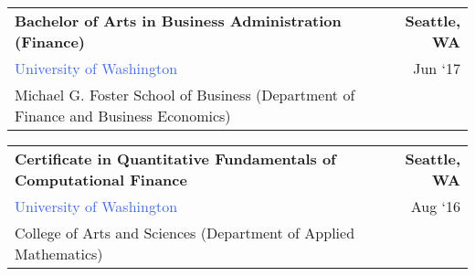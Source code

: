 \documentclass[10pt]{article}
\newcommand{\highlightcolor}{RoyalBlue}
\newcommand{\tabularxwidth}{\textwidth}
\begin{document}
            \vspace{.5em}
        

    
        \begin{tabularx}{\tabularxwidth}{X r}
            \textbf{Bachelor of Arts in Business Administration (Finance)} & \textbf{
    Seattle, 
        WA} \\
            \quad \textcolor{\highlightcolor}{University of Washington} & 
    Jun ‘17 \\
            \quad Michael G. Foster School of Business (Department of Finance and Business Economics) & \\
            
            
                
                    
                
            
        \end{tabularx}

        
            \vspace{.5em}
        

    
        \begin{tabularx}{\tabularxwidth}{X r}
            \textbf{Certificate in Quantitative Fundamentals of Computational Finance} & \textbf{
    Seattle, 
        WA} \\
            \quad \textcolor{\highlightcolor}{University of Washington} & 
    Aug ‘16 \\
            \quad College of Arts and Sciences (Department of Applied Mathematics) & \\
            
            
        \end{tabularx}

        

    

\end{document}
